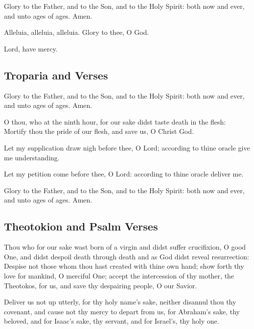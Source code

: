 Glory to the Father, and to the Son, and to the Holy Spirit: both now and ever, and unto ages of ages. Amen.

Alleluia, alleluia, alleluia. Glory to thee, O God. 

Lord, have mercy. 

\subsection{Troparia and Verses}


Glory to the Father, and to the Son, and to the Holy Spirit: both now and ever, and unto ages of ages. Amen.

O thou, who at the ninth hour, for our sake didst taste death in the flesh: Mortify thou the pride of our flesh, and save us, O Christ God. 

 Let my supplication draw nigh before thee, O Lord; according to thine oracle give me understanding. 

 Let my petition come before thee, O Lord: according to thine oracle deliver me. 

Glory to the Father, and to the Son, and to the Holy Spirit: both now and ever, and unto ages of ages. Amen.

\subsection{Theotokion and Psalm Verses}

Thou who for our sake wast born of a virgin and didst suffer crucifixion, O good One, and didst despoil death through death and as God didst reveal resurrection: Despise not those whom thou hast created with thine own hand; show forth thy love for mankind, O merciful One; accept the intercession of thy mother, the Theotokos, for us, and save thy despairing people, O our Savior.

Deliver us not up utterly, for thy holy name's sake, neither disannul thou thy covenant, and cause not thy mercy to depart from us, for Abraham's sake, thy beloved, and for Isaac's sake, thy servant, and for Israel's, thy holy one. 

